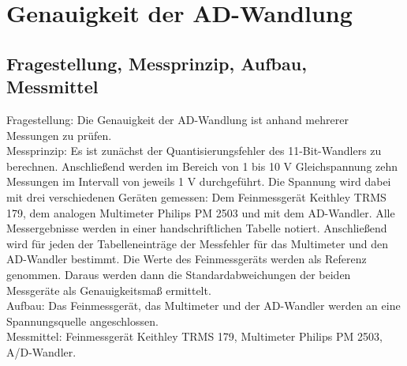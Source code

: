 %
%
\chapter{Genauigkeit der AD-Wandlung}
\label{chap:VERSUCH_2}


\section{Fragestellung, Messprinzip, Aufbau, Messmittel}
\label{chap:VERSUCH_2_FRAGESTELLUNG}
Fragestellung: Die Genauigkeit der AD-Wandlung ist anhand mehrerer Messungen zu prüfen.\\
Messprinzip: Es ist zunächst der Quantisierungsfehler des 11-Bit-Wandlers zu berechnen. Anschließend werden im Bereich von 1 bis 10 V Gleichspannung zehn Messungen im Intervall von jeweils 1 V durchgeführt. Die Spannung wird dabei mit drei verschiedenen Geräten gemessen: Dem Feinmessgerät Keithley TRMS 179, dem analogen Multimeter Philips PM 2503 und mit dem AD-Wandler. Alle Messergebnisse werden in einer handschriftlichen Tabelle notiert. Anschließend wird für jeden der Tabelleneinträge der Messfehler für das Multimeter und den AD-Wandler bestimmt. Die Werte des Feinmessgeräts werden als Referenz genommen. Daraus werden dann die Standardabweichungen der beiden Messgeräte als Genauigkeitsmaß ermittelt.\\
Aufbau: Das Feinmessgerät, das Multimeter und der AD-Wandler werden an eine Spannungsquelle angeschlossen.\\
Messmittel: Feinmessgerät Keithley TRMS 179, Multimeter Philips PM 2503, A/D-Wandler.

